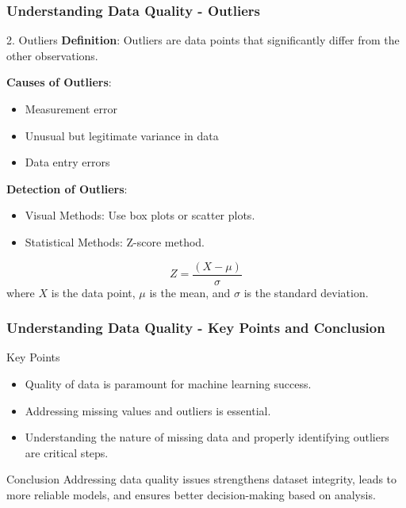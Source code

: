 \documentclass[aspectratio=169]{beamer}
\begin{document}
\begin{frame}[fragile]
    \frametitle{Understanding Data Quality - Outliers}
    \begin{block}{2. Outliers}
        \textbf{Definition}: Outliers are data points that significantly differ from the other observations.

        \textbf{Causes of Outliers}:
        \begin{itemize}
            \item Measurement error
            \item Unusual but legitimate variance in data
            \item Data entry errors
        \end{itemize}

        \textbf{Detection of Outliers}:
        \begin{itemize}
            \item Visual Methods: Use box plots or scatter plots.
            \item Statistical Methods: Z-score method.
        \end{itemize}
        \begin{equation}
            Z = \frac{(X - \mu)}{\sigma}
        \end{equation}
        where \( X \) is the data point, \( \mu \) is the mean, and \( \sigma \) is the standard deviation.
    \end{block}
\end{frame}

\begin{frame}[fragile]
    \frametitle{Understanding Data Quality - Key Points and Conclusion}
    \begin{block}{Key Points}
        \begin{itemize}
            \item Quality of data is paramount for machine learning success.
            \item Addressing missing values and outliers is essential.
            \item Understanding the nature of missing data and properly identifying outliers are critical steps.
        \end{itemize}
    \end{block}

    \begin{block}{Conclusion}
        Addressing data quality issues strengthens dataset integrity, leads to more reliable models, and ensures better decision-making based on analysis.
    \end{block}
\end{frame}
\end{document}
